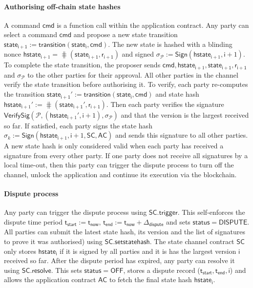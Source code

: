 \documentclass{llncs}
\newcommand{\chanstatus}{\mathsf{status}}
\newcommand{\chandispute}{\mathsf{DISPUTE}}
\newcommand{\chanoff}{\mathsf{OFF}}
\newcommand{\cmd}{\mathsf{cmd}}
\newcommand{\hstatei}{\mathsf{hstate}_{\monotoniccounter}}
\newcommand{\hstateplus}{\ensuremath{\mathsf{hstate}_{\monotoniccounter+1}}}
\newcommand{\monotoniccounter}{\mathsf{i}}
\newcommand{\stateinfoi}{\mathsf{state}_{\mathsf{i}}}
\newcommand{\stateinfoplus}{\mathsf{state}_{\mathsf{i+1}}}
\newcommand{\participant}{\mathcal{P}}
\newcommand{\rani}{\mathsf{r}_{\mathsf{i}}}
\newcommand{\ran}{\mathsf{r}}
\newcommand{\ranplus}{\mathsf{r}_{\mathsf{i+1}}}
\newcommand{\statechannel}{\mathsf{SC}}
\newcommand{\statechanneldispute}{\mathsf{SC}.\mathsf{trigger}}
\newcommand{\statechannelsetstate}{\mathsf{SC}.\mathsf{setstatehash}}
\newcommand{\statechannelresolve}{\mathsf{SC}.\mathsf{resolve}}
\newcommand{\sign}{\mathsf{Sign}}
\newcommand{\verifysig}{\mathsf{VerifySig}}
\newcommand{\appcontract}{\mathsf{AC}}
\newcommand{\timenow}{\mathsf{t}_{\mathsf{now}}}
\newcommand{\timestart}{\mathsf{t}_{\mathsf{start}}}
\newcommand{\timeend}{\mathsf{t}_{\mathsf{end}}}
\newcommand{\timedispute}{\timenow + \mathsf{\Delta}_{\mathsf{dispute}}}
\begin{document}

\paragraph{Authorising off-chain state hashes}
A command $\cmd$ is a function call within the application contract.
Any party can select a command $\cmd$ and propose a new state transition $\stateinfoplus := \mathsf{transition}(\stateinfoi, \cmd)$.
The new state is hashed  with a blinding nonce $\hstateplus = \hash(\stateinfoplus, \ranplus)$ and signed  $\sigma_{\participant} := \sign(\hstateplus,\monotoniccounter+1)$.
To complete the state transition, the proposer sends $\cmd,\hstateplus, \stateinfoplus, \ranplus$ and $\sigma_{\participant}$ to the other parties for their approval.
All other parties in the channel verify the state transition before authorising it. 
To verify, each party re-computes the transition $\stateinfoplus' := \mathsf{transition}(\stateinfoi, \cmd)$ and state hash $\hstateplus' := \hash(\stateinfoplus', \ranplus)$.
Then each party verifies the signature $\verifysig(\participant, (\hstateplus', \monotoniccounter+1), \sigma_{\participant})$ and that the version is the largest received so far. 
If satisfied, each party signs the state hash  $\sigma_{k} := \sign(\hstateplus,\monotoniccounter+1, \statechannel, \appcontract)$ and sends this signature to all other parties. 
A new state hash is only considered valid when each party has received a signature from every other party.  
If one party does not receive all signatures by a local time-out, then this party can trigger the dispute process to turn off the channel, unlock the application and continue its execution via the blockchain. 

\paragraph{Dispute process} 

Any party can trigger the dispute process using $\statechanneldispute$.
This self-enforces the dispute time period $\timestart := \timenow$, $\timeend := \timedispute$ and sets $\chanstatus = \chandispute$. 
All parties can submit the latest state hash, its version and the list of signatures to prove it was authorised) using $\statechannelsetstate$. 
The state channel contract $\statechannel$ only stores $\hstatei$ if it is signed by all parties and it is  has the largest version $\monotoniccounter$ received so far. 
After the dispute period has expired, any party can resolve it using $\statechannelresolve$.
This sets $\chanstatus = \chanoff$, stores a dispute record ($\timestart,\timeend, \monotoniccounter$) and allows the application contract $\appcontract$ to fetch the final state hash $\hstatei$. 
\end{document}
